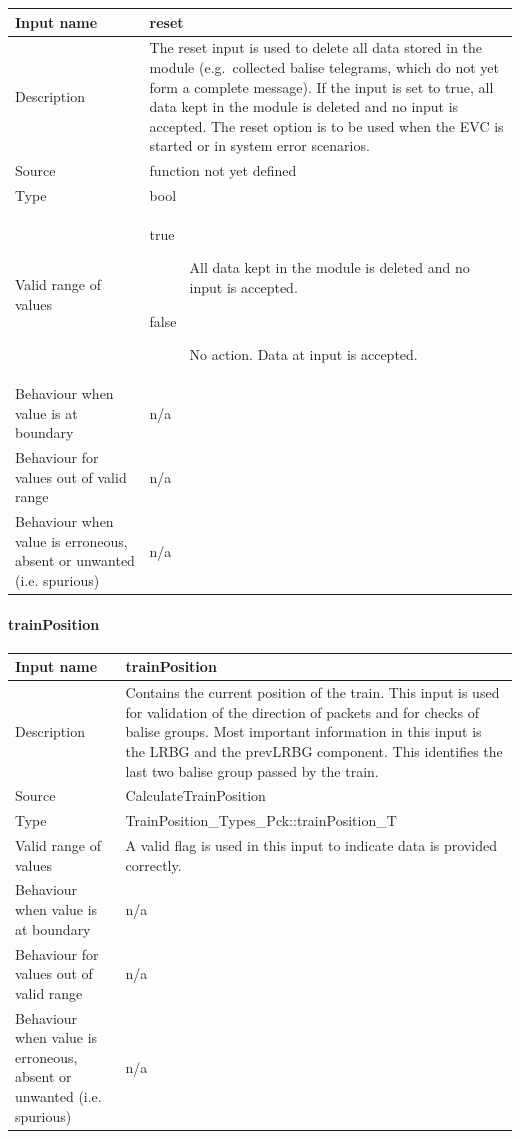 \begin{longtable}{p{}p{}}
\toprule
Input name				& reset \\
\midrule
Description				& The reset input is used to delete all data stored in the module (e.g.~collected balise telegrams, which do not yet form a complete message). If the input is set to true, all data kept in the module is deleted and no input is accepted. The reset option is to be used when the EVC is started or in system error scenarios.\\
\midrule
Source					& function not yet defined
\\ \midrule
Type					& bool \\
\midrule
Valid range of values	& 
\begin{description}
\item[true] All data kept in the module is deleted and no input is accepted.
\item[false] No action. Data at input is accepted.
\end{description} \\
\midrule
Behaviour when value is at boundary	& n/a\\
\midrule
Behaviour for values out of valid range	& n/a\\
\midrule
Behaviour when value is erroneous, absent or unwanted (i.e. spurious) & n/a\\
\bottomrule
\end{longtable}
\newpage
\paragraph{trainPosition}

\begin{longtable}{p{}p{}}
\toprule
Input name				& trainPosition \\
\midrule
Description				& Contains the current position of the train. This input is used for validation of the direction of packets and for checks of balise groups. Most important information in this input is the LRBG and the prevLRBG component. This identifies the last two balise group passed by the train.\\
\midrule
Source					& CalculateTrainPosition \\ 
\midrule
Type					& TrainPosition\_Types\_Pck::trainPosition\_T \\
\midrule
Valid range of values	& A valid flag is used in this input to indicate data is provided correctly.\\
\midrule
Behaviour when value is at boundary	& n/a\\
\midrule
Behaviour for values out of valid range	& n/a\\
\midrule
Behaviour when value is erroneous, absent or unwanted (i.e. spurious) & n/a\\
\bottomrule
\end{longtable}

